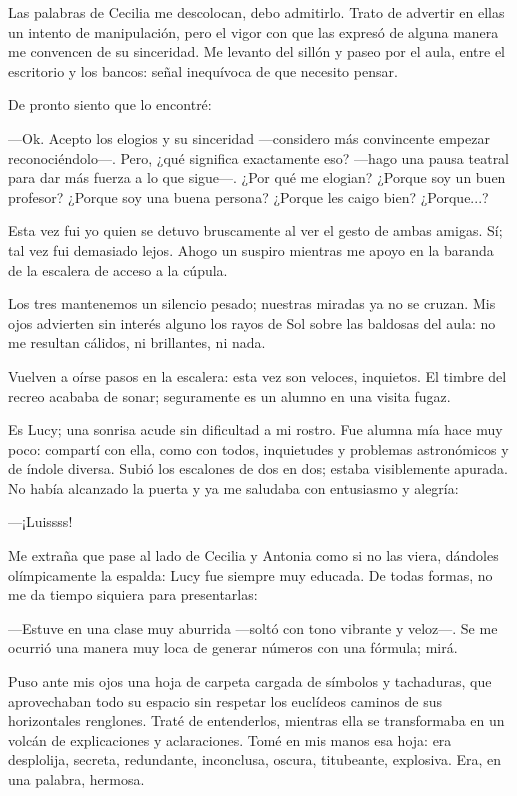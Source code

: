 Las palabras de Cecilia me descolocan, debo admitirlo. Trato de
advertir en ellas un intento de manipulación, pero el vigor con que
las expresó de alguna manera me convencen de su sinceridad. Me levanto
del sillón y paseo por el aula, entre el escritorio y los bancos:
señal inequívoca de que necesito pensar.

De pronto siento que lo encontré:

---Ok. Acepto los elogios y su sinceridad ---considero más convincente
empezar reconociéndolo---. Pero, ¿qué significa exactamente eso?
---hago una pausa teatral para dar más fuerza a lo que sigue---. ¿Por
qué me elogian? ¿Porque soy un buen profesor?  ¿Porque soy una buena
persona? ¿Porque les caigo bien? ¿Porque...?

Esta vez fui yo quien se detuvo bruscamente al ver el gesto de ambas
amigas. Sí; tal vez fui demasiado lejos. Ahogo un suspiro mientras me
apoyo en la baranda de la escalera de acceso a la cúpula.

Los tres mantenemos un silencio pesado; nuestras miradas ya no se
cruzan. Mis ojos advierten sin interés alguno los rayos de Sol sobre
las baldosas del aula: no me resultan cálidos, ni brillantes, ni nada.

Vuelven a oírse pasos en la escalera: esta vez son veloces,
inquietos. El timbre del recreo acababa de sonar; seguramente es un
alumno en una visita fugaz.

Es Lucy; una sonrisa acude sin dificultad a mi rostro. Fue alumna mía
hace muy poco: compartí con ella, como con todos, inquietudes y
problemas astronómicos y de índole diversa. Subió los escalones de dos
en dos; estaba visiblemente apurada. No había alcanzado la puerta y ya
me saludaba con entusiasmo y alegría:

---¡Luissss!

Me extraña que pase al lado de Cecilia y Antonia como si no las viera,
dándoles olímpicamente la espalda: Lucy fue siempre muy educada. De
todas formas, no me da tiempo siquiera para presentarlas:

---Estuve en una clase muy aburrida ---soltó con tono vibrante y
veloz---. Se me ocurrió una manera muy loca de generar números con una
fórmula; mirá.

Puso ante mis ojos una hoja de carpeta cargada de símbolos y
tachaduras, que aprovechaban todo su espacio sin respetar los
euclídeos caminos de sus horizontales renglones. Traté de entenderlos,
mientras ella se transformaba en un volcán de explicaciones y
aclaraciones. Tomé en mis manos esa hoja: era desplolija, secreta,
redundante, inconclusa, oscura, titubeante, explosiva. Era, en una
palabra, hermosa.

